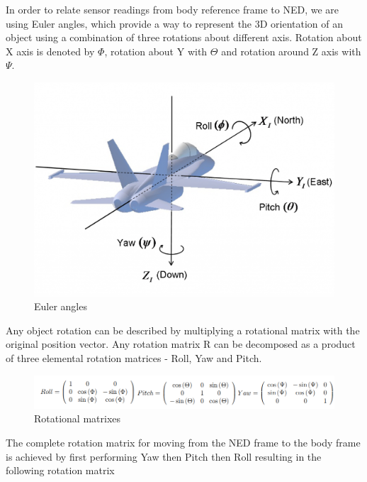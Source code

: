 In order to relate sensor readings from body reference frame to NED, we are using Euler angles, which provide a way to represent the 3D orientation of an object using a combination of three rotations about different axis. Rotation about X axis is denoted by $\Phi$, rotation about Y with $\Theta$ and rotation around Z axis with $\Psi$. 

\begin{figure}[H]
    \begin{center}
    \includegraphics[scale = 0.5]{pictures/IMU/Euler_angles.png}
    \end{center}
    \caption{Euler angles}
    \label{fig:my_label}
\end{figure}

Any object rotation can be described by multiplying a rotational matrix with the original position vector. Any rotation matrix R can be decomposed as a product of three elemental rotation matrices - Roll, Yaw and Pitch.\newline
\begin{figure}[H]
    \begin{center}
    \includegraphics[scale = 0.7]{pictures/IMU/rotational_matrixes.png}
    \end{center}
    \caption{Rotational matrixes}
    \label{fig:my_label}
\end{figure}


The complete rotation matrix for moving from the NED frame to the body frame is achieved by first performing Yaw then Pitch then Roll resulting in the following rotation matrix

